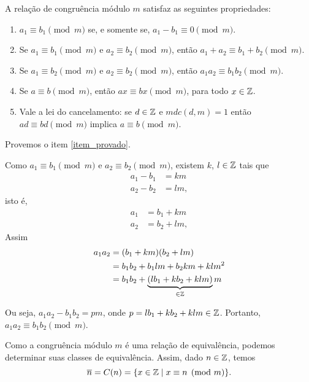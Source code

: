 \begin{teorema}
    A relação de congruência módulo $m$ satisfaz as seguintes propriedades:
    \begin{enumerate}[label={\roman*})]
        \item $a_{1}\equiv b_{1}\pmod{m}$ se, e somente se, $a_{1}-b_{1}\equiv 0\pmod{m}$.
        \item Se $a_{1}\equiv b_{1}\pmod{m}$ e $a_{2}\equiv b_{2}\pmod{m}$, então $a_{1}+a_{2}\equiv b_{1}+b_{2}\pmod{m}$.
        \item Se $a_{1}\equiv b_{2}\pmod{m}$ e $a_{2}\equiv b_{2}\pmod{m}$, então $a_{1}a_{2}\equiv b_{1}b_{2}\pmod{m}$.\label{item_provado}
        \item Se $a\equiv b\pmod{m}$, então $ax\equiv bx\pmod{m}$, para todo $x \in \mathbb{Z}$.
        \item Vale a lei do cancelamento: se $d \in \mathbb{Z}$ e $mdc(d,m) = 1$ então $ad \equiv bd \pmod{m}$ implica $a\equiv b \pmod{m}$.
    \end{enumerate}
\end{teorema}
\begin{prova}
    Provemos o item \ref{item_provado}.

    Como $a_{1}\equiv b_{1}\pmod{m}$ e $a_{2}\equiv b_{2}\pmod{m}$, existem $k$, $l \in \mathbb{Z}$ tais que
    \begin{align*}
        a_1 - b_1 &= km\\
        a_2 - b_2 &= lm,
    \end{align*}
    isto é,
    \begin{align*}
        a_1 &= b_1 + km\\
        a_2 &= b_2 + lm,
    \end{align*}
    Assim
    \begin{align*}
        a_1a_2 &= (b_1 + km)(b_2 + lm) \\ &= b_1b_2 + b_1lm + b_2km + klm^2 \\ &= b_1b_2 + \underbrace{(lb_{1}+kb_{2}+klm)}_{\in \mathbb{Z}}m
    \end{align*}

    Ou seja, $a_1a_2 - b_1b_2 = pm$, onde $p = lb_1 + kb_2 + klm \in \mathbb{Z}$. Portanto, $a_1a_2 \equiv b_1b_2 \pmod{m}$.
\end{prova}

Como a congruência módulo $m$ é uma relação de equivalência, podemos determinar suas classes de equivalência. Assim, dado $n \in \mathbb{Z}$, temos
\[
    \overline{n} = C(n) = \{x \in \mathbb{Z} \mid x\equiv n \pmod{m}\}.
\]

